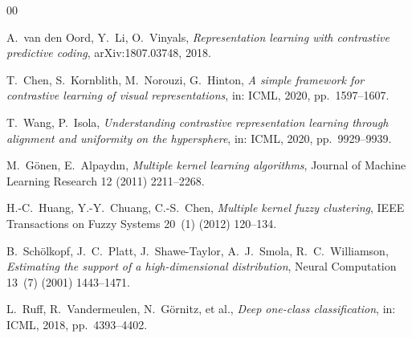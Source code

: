 \documentclass[preprint,12pt]{elsarticle}
\begin{document}
\begin{thebibliography}{00}

A.~van den Oord, Y.~Li, O.~Vinyals,
\textit{Representation learning with contrastive predictive coding},
arXiv:1807.03748, 2018.

T.~Chen, S.~Kornblith, M.~Norouzi, G.~Hinton,
\textit{A simple framework for contrastive learning of visual
representations}, in: ICML, 2020, pp.\ 1597--1607.

T.~Wang, P.~Isola,
\textit{Understanding contrastive representation learning through alignment
and uniformity on the hypersphere}, in: ICML, 2020, pp.\ 9929--9939.

M.~G\"onen, E.~Alpayd{\i}n,
\textit{Multiple kernel learning algorithms},
Journal of Machine Learning Research 12 (2011) 2211--2268.

H.-C.~Huang, Y.-Y.~Chuang, C.-S.~Chen,
\textit{Multiple kernel fuzzy clustering},
IEEE Transactions on Fuzzy Systems 20~(1) (2012) 120--134.

B.~Sch\"olkopf, J.~C.~Platt, J.~Shawe-Taylor, A.~J.~Smola, R.~C.~Williamson,
\textit{Estimating the support of a high-dimensional distribution},
Neural Computation 13~(7) (2001) 1443--1471.

L.~Ruff, R.~Vandermeulen, N.~G\"ornitz, et al.,
\textit{Deep one-class classification}, in: ICML, 2018, pp.\ 4393--4402.

\end{thebibliography}
\end{document}
